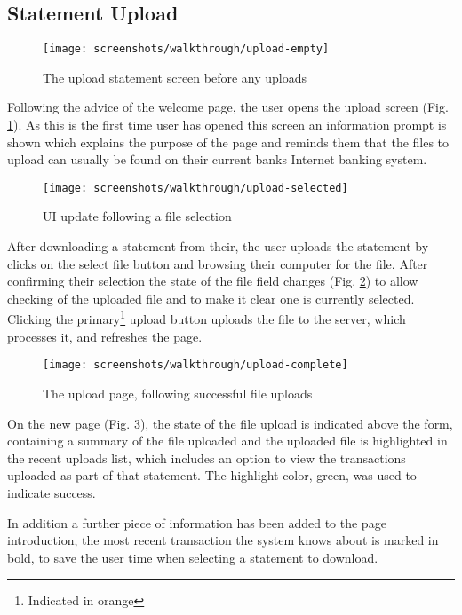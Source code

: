 \subsection{Statement Upload}

\begin{figure}
\centering
\texttt{[image: screenshots/walkthrough/upload-empty]}
\caption{The upload statement screen before any uploads}
\label{fig:uploadempty}
\end{figure}

Following the advice of the welcome page, the user opens the upload screen (Fig. \ref{fig:uploadempty}). As this is the first time user has opened this screen an information prompt is shown which explains the purpose of the page and reminds them that the files to upload can usually be found on their current banks Internet banking system.

\begin{figure}
\centering
\texttt{[image: screenshots/walkthrough/upload-selected]}
\caption{UI update following a file selection}
\label{fig:upload-selected}
\end{figure}

After downloading a statement from their, the user uploads the statement by clicks on the select file button and browsing their computer for the file. After confirming their selection the state of the file field changes (Fig. \ref{fig:upload-selected}) to allow checking of the uploaded file and to make it clear one is currently selected. Clicking the primary\footnote{Indicated in orange} upload button uploads the file to the server, which processes it, and refreshes the page.

\begin{figure}
\centering
\texttt{[image: screenshots/walkthrough/upload-complete]}
\caption{The upload page, following successful file uploads}
\label{fig:upload-complete}
\end{figure}

On the new page (Fig. \ref{fig:upload-complete}), the state of the file upload is indicated above the form, containing a summary of the file uploaded and the uploaded file is highlighted in the recent uploads list, which includes an option to view the transactions uploaded as part of that statement. The highlight color, green, was used to indicate success. 

In addition a further piece of information has been added to the page introduction, the most recent transaction the system knows about is marked in bold, to save the user time when selecting a statement to download.


